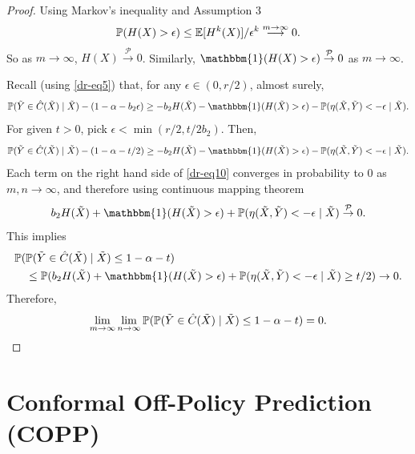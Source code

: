 \begin{proof}
Using Markov's inequality and Assumption 3
\begin{align}
    \mathbb{P}(H(X) > \epsilon) \leq \mathbb{E}[H^k(X)]/\epsilon^k \overset{m \rightarrow \infty}{\longrightarrow} 0.
\end{align}
So as $m\rightarrow \infty$, $H(X)\overset{\mathcal{P}}{\rightarrow} 0$. Similarly, $\mathbbm{1}(H(X) > \epsilon) \overset{\mathcal{P}}{\rightarrow} 0$ as $m\rightarrow \infty$.

Recall (using \ref{dr-eq5}) that, for any $\epsilon \in (0, r/2)$, almost surely,
\begin{align}
    \p(\tilde{Y} \in \hat{C}(\tilde{X}) \mid \tilde{X}) - (1-\alpha -b_2 \epsilon) \geq - b_2 H(\tilde{X}) - \mathbbm{1}(H(\tilde{X}) > \epsilon) - \p(\eta(\tilde{X}, \tilde{Y}) < -\epsilon \mid \tilde{X}).
\end{align}
For given $t > 0$, pick $\epsilon < \min(r/2, t/2b_2)$. Then,
\begin{align}
    \p(\tilde{Y} \in \hat{C}(\tilde{X}) \mid \tilde{X}) - (1-\alpha -t/2) \geq - b_2 H(\tilde{X}) - \mathbbm{1}(H(\tilde{X}) > \epsilon) - \p(\eta(\tilde{X}, \tilde{Y}) < -\epsilon \mid \tilde{X}). \label{dr-eq10}
\end{align}
Each term on the right hand side of \eqref{dr-eq10} converges in probability to 0 as $m, n \rightarrow \infty$, and therefore using continuous mapping theorem  
$$ 
b_2 H(\tilde{X}) + \mathbbm{1}(H(\tilde{X}) > \epsilon) + \p(\eta(\tilde{X}, \tilde{Y}) < -\epsilon \mid \tilde{X}) \overset{\mathcal{P}}{\rightarrow} 0.
$$
This implies
\begin{align}
    &\p(\p(\tilde{Y} \in \hat{C}(\tilde{X}) \mid \tilde{X}) \leq 1-\alpha -t) \nonumber\\
    &\quad \leq \p(b_2 H(\tilde{X}) + \mathbbm{1}(H(\tilde{X}) > \epsilon) + \p(\eta(\tilde{X}, \tilde{Y}) < -\epsilon \mid \tilde{X}) \geq t/2) \rightarrow 0. \nonumber
\end{align}
Therefore, 
\begin{align}
    \lim_{m \rightarrow \infty} \lim_{n \rightarrow \infty} \mathbb{P}(\mathbb{P}(\tilde{Y} \in \hat{C}(\tilde{X}) \mid \tilde{X}) \leq 1-\alpha -t) = 0.
\end{align}
\end{proof}

\newpage

\section{Conformal Off-Policy Prediction (COPP)}


